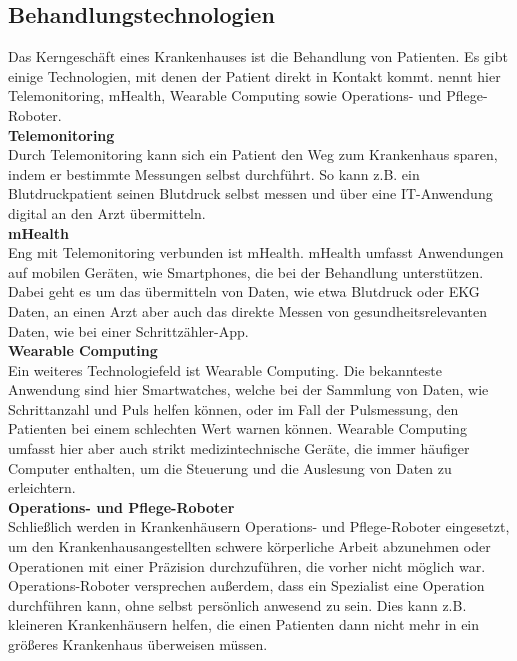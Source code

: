\subsection{Behandlungstechnologien}
	Das Kerngeschäft eines Krankenhauses ist die Behandlung von Patienten. Es gibt einige Technologien, mit denen der Patient direkt in Kontakt kommt.
	\cite{braeutigam2017} nennt hier Telemonitoring, mHealth, Wearable Computing sowie Operations- und Pflege-Roboter.
	\vspace{\parheadvspace}\\
	\textbf{Telemonitoring}\\
	Durch Telemonitoring kann sich ein Patient den Weg zum Krankenhaus sparen, indem er bestimmte Messungen selbst durchführt. So kann z.B. ein Blutdruckpatient seinen Blutdruck selbst messen und über eine IT-Anwendung digital an den Arzt übermitteln. 
	\vspace{\parheadvspace}\\
	\textbf{mHealth}\\
	Eng mit Telemonitoring verbunden ist mHealth. mHealth umfasst Anwendungen auf mobilen Geräten, wie Smartphones, die bei der Behandlung unterstützen. Dabei geht es um das übermitteln von Daten, wie etwa Blutdruck oder EKG Daten, an einen Arzt aber auch das direkte Messen von gesundheitsrelevanten Daten, wie bei einer Schrittzähler-App. \parencite{Matusiewicz2017}
	\vspace{\parheadvspace}\\
	\textbf{Wearable Computing}\\
	Ein weiteres Technologiefeld ist Wearable Computing. Die bekannteste Anwendung sind hier Smartwatches, welche bei der Sammlung von Daten, wie Schrittanzahl und Puls helfen können, oder im Fall der Pulsmessung, den Patienten bei einem schlechten Wert warnen können. Wearable Computing umfasst hier aber auch strikt medizintechnische Geräte, die immer häufiger Computer enthalten, um die Steuerung und die Auslesung von Daten zu erleichtern. \parencite{Gerke2017}
	\vspace{\parheadvspace}\\
	\textbf{Operations- und Pflege-Roboter}\\
	Schließlich werden in Krankenhäusern Operations- und Pflege-Roboter eingesetzt, um den Krankenhausangestellten schwere körperliche Arbeit abzunehmen oder Operationen mit einer Präzision durchzuführen, die vorher nicht möglich war. Operations-Roboter versprechen außerdem, dass ein Spezialist eine Operation durchführen kann, ohne selbst persönlich anwesend zu sein. Dies kann z.B. kleineren Krankenhäusern helfen, die einen Patienten dann nicht mehr in ein größeres Krankenhaus überweisen müssen. \parencite{Bardash2010}
